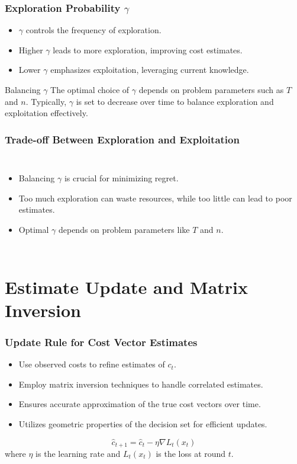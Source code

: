 \documentclass{beamer}
\begin{document}
\begin{frame}
\frametitle{Exploration Probability \( \gamma \)}
\begin{itemize}
    \item \( \gamma \) controls the frequency of exploration.
    \item Higher \( \gamma \) leads to more exploration, improving cost estimates.
    \item Lower \( \gamma \) emphasizes exploitation, leveraging current knowledge.
\end{itemize}
\begin{block}{Balancing \( \gamma \)}
    The optimal choice of \( \gamma \) depends on problem parameters such as \( T \) and \( n \). Typically, \( \gamma \) is set to decrease over time to balance exploration and exploitation effectively.
\end{block}
\end{frame}

\begin{frame}
\frametitle{Trade-off Between Exploration and Exploitation}
\begin{columns}
    \begin{itemize}
        \item Balancing \( \gamma \) is crucial for minimizing regret.
        \item Too much exploration can waste resources, while too little can lead to poor estimates.
        \item Optimal \( \gamma \) depends on problem parameters like \( T \) and \( n \).
    \end{itemize}
\end{columns}
\end{frame}

\section{Estimate Update and Matrix Inversion}

\begin{frame}
\frametitle{Update Rule for Cost Vector Estimates}
\begin{itemize}
    \item Use observed costs to refine estimates of \( c_t \).
    \item Employ matrix inversion techniques to handle correlated estimates.
    \item Ensures accurate approximation of the true cost vectors over time.
    \item Utilizes geometric properties of the decision set for efficient updates.
\end{itemize}
\begin{equation*}
    \hat{c}_{t+1} = \hat{c}_t - \eta \nabla L_t(x_t)
\end{equation*}
where \( \eta \) is the learning rate and \( L_t(x_t) \) is the loss at round \( t \).
\end{frame}
\end{document}
